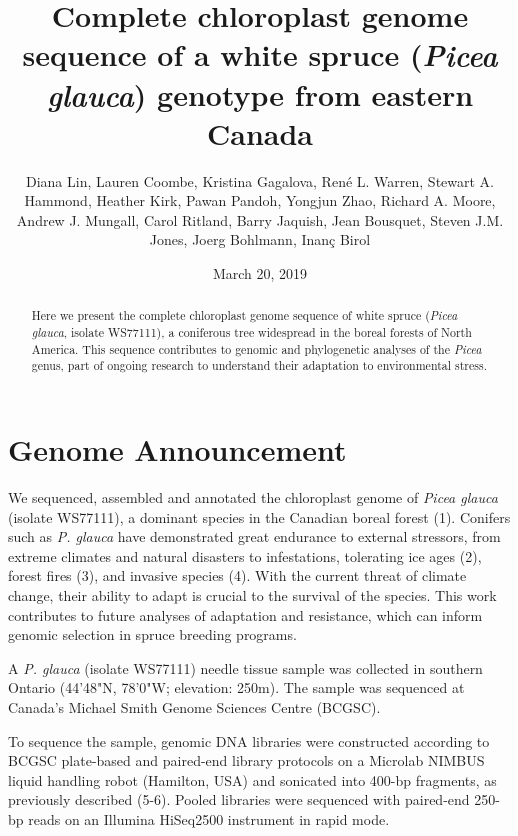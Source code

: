 \documentclass[titlepage,11pt, oneside]{article}   	%
\title{\textbf{Complete chloroplast genome sequence of a white spruce (\textit{Picea glauca}) genotype from eastern Canada}}
\author{Diana Lin, Lauren Coombe, Kristina Gagalova, Ren\'{e} L. Warren, Stewart A. Hammond, Heather Kirk, Pawan Pandoh, Yongjun Zhao, Richard A. Moore, Andrew J. Mungall, Carol Ritland, Barry Jaquish, Jean Bousquet, Steven J.M. Jones, Joerg Bohlmann, Inan\c{c} Birol}
\date{March 20, 2019}					%
\begin{document}
\maketitle
\begin{abstract}
Here we present the complete chloroplast genome sequence of white spruce (\textit{Picea glauca}, isolate WS77111), a coniferous tree widespread in the boreal forests of North America. This sequence contributes to genomic and phylogenetic analyses of the \textit{Picea} genus, part of ongoing research to understand their adaptation to environmental stress.


\end{abstract}

\section*{Genome Announcement}
We sequenced, assembled and annotated the chloroplast genome of \textit{Picea glauca} (isolate WS77111), a dominant species in the Canadian boreal forest (1). Conifers such as \textit{P. glauca} have demonstrated great endurance to external stressors, from extreme climates and natural disasters to infestations, tolerating ice ages (2), forest fires (3), and invasive species (4). With the current threat of climate change, their ability to adapt is crucial to the survival of the species. This work contributes to future analyses of adaptation and resistance, which can inform genomic selection in spruce breeding programs.
\newline
\par
A \textit{P. glauca} (isolate WS77111) needle tissue sample was collected in southern Ontario (44'48"N, 78'0"W; elevation: 250m). The sample was sequenced at Canada’s Michael Smith Genome Sciences Centre (BCGSC).
\newline
\par
To sequence the sample, genomic DNA libraries were constructed according to BCGSC plate-based and paired-end library protocols on a Microlab NIMBUS liquid handling robot (Hamilton, USA) and sonicated into 400-bp fragments, as previously described (5-6). Pooled libraries were sequenced with paired-end 250-bp reads on an Illumina HiSeq2500 instrument in rapid mode.
\newline
\par
\end{document}
